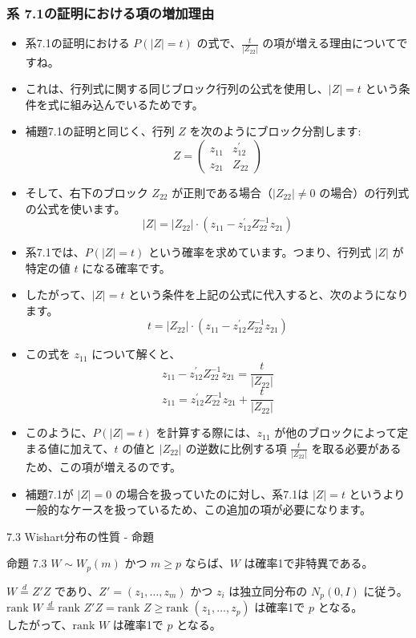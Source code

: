 \documentclass[aspectratio=169]{beamer}
\begin{document}
\begin{frame}
\frametitle{系 7.1の証明における項の増加理由}
\begin{itemize}
    \item 系7.1の証明における $P(|Z|=t)$ の式で、$\frac{t}{|Z_{22}|}$ の項が増える理由についてですね。
    \item これは、行列式に関する同じブロック行列の公式を使用し、$|Z|=t$ という条件を式に組み込んでいるためです。
    \item 補題7.1の証明と同じく、行列 $Z$ を次のようにブロック分割します:
    \[ Z=\begin{pmatrix}z_{11}&z_{12}^{\prime}\\ z_{21}&Z_{22}\end{pmatrix} \]
    \item そして、右下のブロック $Z_{22}$ が正則である場合（$|Z_{22}|\ne0$ の場合）の行列式の公式を使います。
    \[ |Z|=|Z_{22}|\cdot(z_{11}-z_{12}^{\prime}Z_{22}^{-1}z_{21}) \]
    \item 系7.1では、$P(|Z|=t)$ という確率を求めています。つまり、行列式 $|Z|$ が特定の値 $t$ になる確率です。
    \item したがって、$|Z|=t$ という条件を上記の公式に代入すると、次のようになります。
    \[ t=|Z_{22}|\cdot(z_{11}-z_{12}^{\prime}Z_{22}^{-1}z_{21}) \]
    \item この式を $z_{11}$ について解くと、
    \[ z_{11}-z_{12}^{\prime}Z_{22}^{-1}z_{21}=\frac{t}{|Z_{22}|} \]
    \[ z_{11}=z_{12}^{\prime}Z_{22}^{-1}z_{21}+\frac{t}{|Z_{22}|} \]
    \item このように、$P(|Z|=t)$ を計算する際には、$z_{11}$ が他のブロックによって定まる値に加えて、$t$ の値と $|Z_{22}|$ の逆数に比例する項 $\frac{t}{|Z_{22}|}$ を取る必要があるため、この項が増えるのです。
    \item 補題7.1が $|Z|=0$ の場合を扱っていたのに対し、系7.1は $|Z|=t$ というより一般的なケースを扱っているため、この追加の項が必要になります。
\end{itemize}
\end{frame}

\begin{frame}{7.3 Wishart分布の性質 - 命題}
\begin{block}{命題 7.3}
$W \sim W_p(m)$ かつ $m \ge p$ ならば、$W$ は確率1で非特異である。
\end{block}

$W \overset{d}{=} Z'Z$ であり、$Z' = (z_1, \dots, z_m)$ かつ $z_i$ は独立同分布の $N_p(0, I)$ に従う。\\
$\text{rank } W \overset{d}{=} \text{rank } Z'Z = \text{rank } Z \ge \text{rank } (z_1, \dots, z_p)$ は確率1で $p$ となる。\\
したがって、$\text{rank } W$ は確率1で $p$ となる。
\end{frame}
\end{document}
